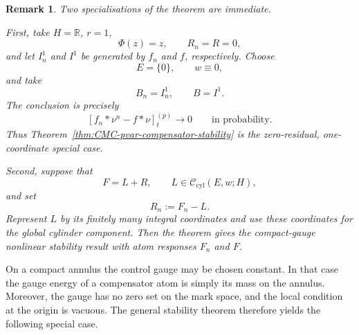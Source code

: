 \documentclass[a4paper,10pt]{article}
\newtheorem{rema}[thm]{Remark}
\begin{document}
\begin{rema}
Two specialisations of the theorem are immediate.

First, take \(H=\mathbb R\), \(r=1\),
\[
        \Phi(z)=z,
        \qquad
        R_n=R=0,
\]
and let \(I_n^1\) and \(I^1\) be generated by \(f_n\) and \(f\),
respectively. Choose
\[
        E=\{0\},
        \qquad
        w\equiv0,
\]
and take
\[
        B_n=I_n^1,
        \qquad
        B=I^1.
\]
The conclusion is precisely
\[
        [f_n*\nu^n-f*\nu]^{(p)}_t
        \longrightarrow0
        \qquad\text{in probability}.
\]
Thus Theorem~\ref{thm:CMC-pvar-compensator-stability} is the
zero-residual, one-coordinate special case.

Second, suppose that
\[
        F=L+R,
        \qquad
        L\in\mathcal C_{\mathrm{cyl}}(E,w;H),
\]
and set
\[
        R_n:=F_n-L.
\]
Represent \(L\) by its finitely many integral coordinates and use
these coordinates for the global cylinder component. Then the theorem
gives the compact-gauge nonlinear stability result with atom
responses \(F_n\) and \(F\).
\end{rema}

On a compact annulus the control gauge may be chosen constant. In that
case the gauge energy of a compensator atom is simply its mass on the
annulus. Moreover, the gauge has no zero set on the mark space, and
the local condition at the origin is vacuous. The general stability
theorem therefore yields the following special case.
\end{document}

